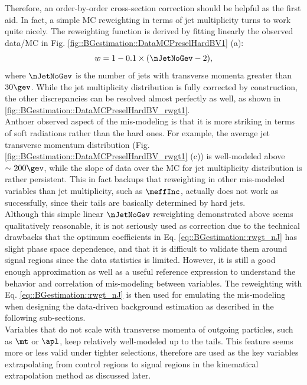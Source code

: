 Therefore, an order-by-order cross-section correction should be helpful as the first aid. In fact, a simple MC reweighting in terms of jet multiplicity turns to work quite nicely. The reweighting function is derived by fitting linearly the observed data/MC in Fig. \ref{fig::BGestimation::DataMCPreselHardBV1} (a):
\begin{equation}
w = 1 - 0.1 \times (\nJetNoGev-2) \label{eq::BGestimation::rwgt_nJ},
\end{equation}
where $\nJetNoGev$ is the number of jets with transverse momenta greater than $30\gev$. While the jet multiplicity distribution is fully corrected by construction, the other discrepancies can be resolved almost perfectly as well, as shown in \ref{fig::BGestimation::DataMCPreselHardBV_rwgt1}. \\

Anthoer observed aspect of the mis-modeling is that it is more striking in terms of soft radiations rather than the hard ones. For example, the average jet transverse momentum distribution (Fig. \ref{fig::BGestimation::DataMCPreselHardBV_rwgt1} (c)) is well-modeled above $\sim 200 \gev$, while the slope of data over the MC for jet multiplicity distribution is rather persistent. This in fact backups that reweighting in other mis-modeled variables than jet multiplicity, such as $\meffInc$, actually does not work as successfully, since their tails are basically determined by hard jets. \\

Although this simple linear $\nJetNoGev$ reweighting demonstrated above seems qualitatively reasonable, it is not seriously used as correction due to the technical drawbacks that the optimum coefficients in Eq. \ref{eq::BGestimation::rwgt_nJ} has slight phase space dependence, and that it is difficult to validate them around signal regions since the data statistics is limited. However, it is still a good enough approximation as well as a useful reference expression to understand the behavior and correlation of mis-modeling between variables. The reweighting with Eq. \ref{eq::BGestimation::rwgt_nJ} is then used for emulating the mis-modeling when designing the data-driven background estimation as described in the following sub-sections. \\

Variables that do not scale with transverse momenta of outgoing particles, such as $\mt$ or $\apl$, keep relatively well-modeled up to the tails. This feature seems more or less valid under tighter selections, therefore are used as the key variables extrapolating from control regions to signal regions in the kinematical extrapolation method as discussed later.

